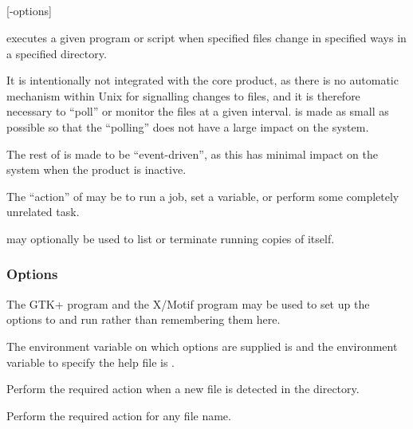 \subsection{\BtfilemonName}
\begin{expara}

\BtfilemonName{} [-options]

\end{expara}

\PrBtfilemon{} executes a given program or script when specified files change in specified ways in a specified directory.

It is intentionally not integrated with the \ProductName{} core product, as there is no
automatic mechanism within Unix for signalling changes to files, and it is therefore necessary to ``poll'' or monitor
the files at a given interval. \PrBtfilemon{} is made as small as possible so that the ``polling'' does not have a large impact
on the system.

The rest of \ProductName{} is made to be ``event-driven'', as this has minimal impact on the system when the product is inactive.

The ``action'' of \PrBtfilemon{} may be to run a \ProductName{} job, set a variable, or perform some
completely unrelated task.

\PrBtfilemon{} may optionally be used to list or terminate running copies of itself.

\subsubsection{Options}
The GTK+ program \PrXfilemon{} and the X/Motif program \PrXmfilemon{} may be used to set
up the options to and run \PrBtfilemon{} rather than remembering them here.

The environment variable on which options are supplied is \filename{\BtfilemonVarname} and the environment variable to specify
the help file is .

\explainopt


Perform the required action when a new file is detected in the directory.


Perform the required action for any file name.



